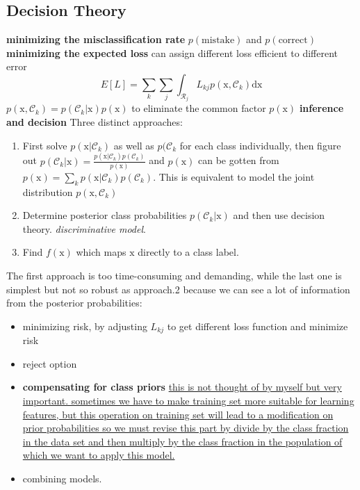 \documentclass[a4paper]{book}
\newcommand{\mrm}{\mathrm}
\begin{document}
\subsection{Decision Theory}
\textbf{minimizing the misclassification rate} $p(\mathrm{mistake})$ and $p(\mathrm{correct})$ \newline
\textbf{minimizing the expected loss}\newline
can assign different loss efficient to different error
\begin{equation}\label{eq1.8}
  E[L] = \sum_k\sum_j\int_{\mathcal{R}_j}L_{kj}p(\mathrm{x},\mathcal{C}_k)\mathrm {dx}
\end{equation}
$p(\mathrm{x},\mathcal{C}_k) = p(\mathcal{C}_k|\mathrm{x})p(\mathrm{x})$ to eliminate the common factor $p(\mathrm x)$ \newline
\textbf{ inference and decision}\newline
Three distinct approaches:
\begin{enumerate}
    \item First solve $p(\mrm{x}|\mathcal C_k)$ as well as $p(\mathcal C_k$ for each class individually, then figure out $p(\mathcal C_k|\mrm x) = \frac{p(\mathrm x|\mathcal C_k)p(\mathcal C_k)}{p(\mrm x)}$ and $p(\mrm x)$ can be gotten from $p(\mrm x) = \sum_kp(\mrm x|\mathcal C_k)p(\mathcal C_k)$. This is equivalent to model the joint distribution $p(\mrm x, \mathcal C_k)$
  \item Determine posterior class probabilities $p(\mathcal C_k|\mrm x)$  and then use decision theory.  \emph{discriminative model}.
  \item Find $f(\mathrm x)$ which maps $\mrm{x}$ directly to a class label.
\end{enumerate}
The first approach is too time-consuming and demanding, while the last one is simplest but not so robust as approach.2 because we can see a lot of information from the posterior probabilities:
\begin{itemize}
  \item  minimizing risk,  by adjusting $L_{kj}$ to get different loss function and minimize risk
  \item reject option
  \item \textbf{compensating for class priors} \uline{this is not thought of by myself but very important. sometimes we have to make training set more suitable for learning features, but this operation on training set will lead to a modification on prior probabilities so we must revise this part by divide by the class fraction in the data set and then multiply by the class fraction in the population of which we want to apply this model.}
  \item combining models.
\end{itemize}
\end{document}
